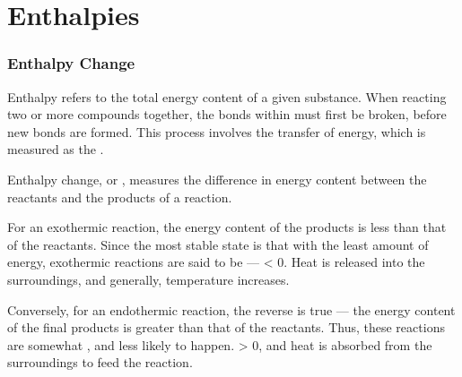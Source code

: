 
\pagebreak
\part{Enthalpies}

	\section{Enthalpy Change}

		Enthalpy refers to the total energy content of a given substance. When reacting two or more compounds together, the bonds within
		must first be broken, before new bonds are formed. This process involves the transfer of energy, which is measured as the
		.

		Enthalpy change, or \enth{}, measures the difference in energy content between the reactants and the products of a reaction.

		For an exothermic reaction, the energy content of the products is less than that of the reactants. Since the most stable state
		is that with the least amount of energy, exothermic reactions are said to be  --- \enth{} < 0.
		Heat is released into the surroundings, and generally, temperature increases.


		\pagebreak
		Conversely, for an endothermic reaction, the reverse is true --- the energy content of the final products is greater than that
		of the reactants. Thus, these reactions are somewhat , and less likely to happen.
		\enth{} > 0, and heat is absorbed from the surroundings to feed the reaction.


